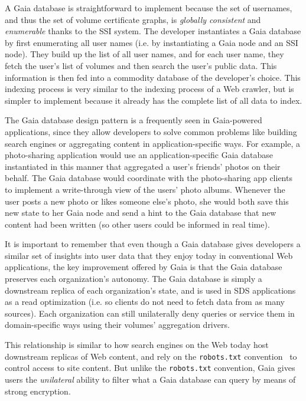 A Gaia database is straightforward to
implement because the set of usernames, and thus the set of volume certificate
graphs, is \emph{globally consistent} and \emph{enumerable} thanks to the SSI
system.  The developer instantiates a Gaia database by first
enumerating all user names (i.e. by instantiating a Gaia node and
an SSI node).  They build up the list of all user names, and for each user name,
they fetch the user's list of volumes and then search the user's public data.
This information is then fed into a commodity database of the developer's
choice.  This indexing process is very similar to the indexing process of a Web
crawler, but is simpler to implement because it already has the complete list of
all data to index.

The Gaia database design pattern is a frequently seen in Gaia-powered applications,
since they allow developers to solve common problems like building search
engines or aggregating content in application-specific ways.  For example, 
a photo-sharing application would use
an application-specific Gaia database instantiated in this manner that
aggregated a user's friends' photos on their behalf.  The Gaia database
would coordinate with the photo-sharing app clients to implement a write-through view of
the users' photo albums.  Whenever the user posts a new photo or likes someone else's
photo, she would both save this new state to her Gaia node and send a hint
to the Gaia database that new content had been written (so other users could
be informed in real time).

It is important to remember that even though a Gaia database gives
developers a similar set of insights into user data that they enjoy today in
conventional Web applications, the key improvement offered by Gaia is that 
the Gaia database preserves each
organization's autonomy.  The Gaia database is simply a downstream replica of
each organization's state, and is used in SDS applications as a read optimization
(i.e. so clients do not need to fetch data from as many sources).
Each organization can still unilaterally deny queries or service them in
domain-specific ways using their volumes' aggregation drivers.

This relationship is similar to how search engines on the Web today host downstream
replicas of Web content, and rely on the \texttt{robots.txt}
convention~\cite{robots-txt-convention} to control access to site content.
But unlike the \texttt{robots.txt} convention, Gaia gives users the
\emph{unilateral} ability to filter what a Gaia database can query by means of
strong encryption.

